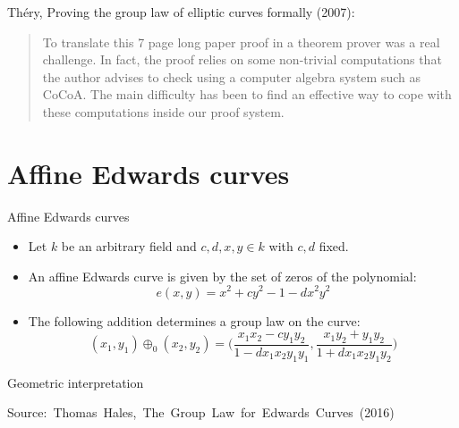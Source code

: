 \documentclass[10pt]{beamer}
\def\smalldot#1{\draw[fill=black] (#1) %
	node [inner sep=1.3pt,shape=circle,fill=black] {}}
\begin{document}
\begin{frame}
Th\'ery, Proving the group law of elliptic curves formally (2007): 
\vspace{1cm}

\begin{quote}
To translate this 7 page long paper proof in a theorem
prover was a real challenge. In fact, the proof relies on
some non-trivial computations that the author advises to
check using a computer algebra system such as CoCoA.
The main difficulty has been to find an effective way to
cope with these computations inside our proof system.
\end{quote}
\end{frame}

\section{Affine Edwards curves}

\begin{frame}{Affine Edwards curves}
\begin{itemize}
	\setlength\itemsep{2em}
	\item Let $k$ be an arbitrary field and $c,d,x,y \in k$ with $c,d$ fixed.
	\item An affine Edwards curve is given by the set of zeros of the polynomial: \[e(x,y) = x^2 + cy^2 - 1 - d x^2y^2\]
	\item The following addition determines a group law on the curve: \[(x_1,y_1) \oplus_0 (x_2,y_2) = \Big(\frac{x_1x_2-cy_1y_2}{1-dx_1x_2y_1y_1},\frac{x_1y_2+y_1 y_2}{1+d x_1 x_2 y_1y_2}\Big)\]
\end{itemize}
\end{frame}

\begin{frame}{Geometric interpretation}
\begin{figure}
\end{figure}
\begin{figure}
\end{figure}
\hspace*{10pt}\hbox{\scriptsize Source: Thomas Hales, The Group Law for Edwards Curves (2016)}
\end{frame}
\end{document}
